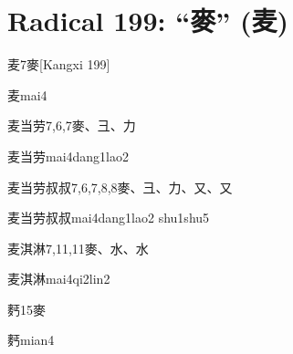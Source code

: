 
\section*{Radical 199: ``⿆'' (麦)}

\begin{Entry}{麦}{7}{⿆}[Kangxi 199]
  \begin{Phonetics}{麦}{mai4}
  \end{Phonetics}
\end{Entry}

\begin{Entry}{麦当劳}{7,6,7}{⿆、⼹、⼒}
  \begin{Phonetics}{麦当劳}{mai4dang1lao2}
  \end{Phonetics}
\end{Entry}

\begin{Entry}{麦当劳叔叔}{7,6,7,8,8}{⿆、⼹、⼒、⼜、⼜}
  \begin{Phonetics}{麦当劳叔叔}{mai4dang1lao2 shu1shu5}
  \end{Phonetics}
\end{Entry}

\begin{Entry}{麦淇淋}{7,11,11}{⿆、⽔、⽔}
  \begin{Phonetics}{麦淇淋}{mai4qi2lin2}
  \end{Phonetics}
\end{Entry}

\begin{Entry}{麫}{15}{⿆}
  \begin{Phonetics}{麫}{mian4}
  \end{Phonetics}
\end{Entry}


